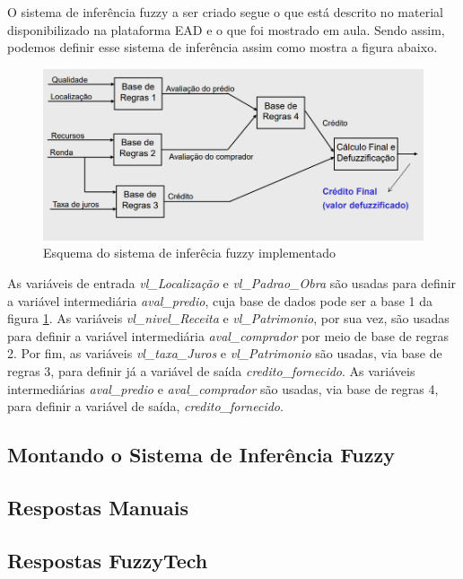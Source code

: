 \documentclass[12pt]{article}
\begin{document}
O sistema de inferência fuzzy a ser criado segue o que está descrito no material disponibilizado na plataforma EAD e o que foi mostrado em aula. Sendo assim, podemos definir esse sistema de inferência assim como mostra a figura abaixo.
\begin{figure}[H]
	\centering
	\includegraphics[width=0.9\linewidth]{Imagens/financiamento/esquemaSIF}
	\caption{Esquema do sistema de inferêcia fuzzy implementado}
	\label{fig:esquemasif}
\end{figure}

As variáveis de entrada \textit{vl\_Localização} e \textit{vl\_Padrao\_Obra} são usadas para definir a variável intermediária \textit{aval\_predio}, cuja base de dados pode ser a base 1 da figura \ref{fig:esquemasif}. As variáveis \textit{vl\_nivel\_Receita} e \textit{vl\_Patrimonio}, por sua vez, são usadas para definir a variável intermediária \textit{aval\_comprador} por meio de base de regras 2. Por fim, as variáveis \textit{vl\_taxa\_Juros} e \textit{vl\_Patrimonio} são usadas, via base de regras 3, para definir já a variável de saída \textit{credito\_fornecido}. As variáveis intermediárias \textit{aval\_predio} e \textit{aval\_comprador} são usadas, via base de regras 4, para definir a variável de saída, \textit{credito\_fornecido}.

\subsection{Montando o Sistema de Inferência Fuzzy}

\subsection{Respostas Manuais}

\subsection{Respostas FuzzyTech}
\end{document}
